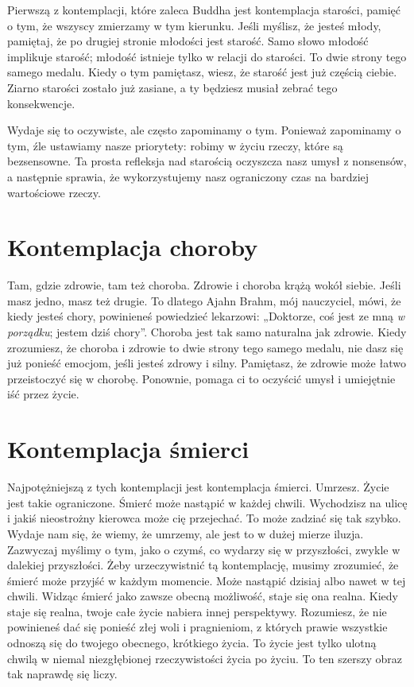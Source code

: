 \documentclass[12pt,openany]{book}
\begin{document}
Pierwszą z kontemplacji, które zaleca Buddha jest kontemplacja starości, pamięć o tym, że wszyscy zmierzamy w tym kierunku. Jeśli myślisz, że jesteś młody, pamiętaj, że po drugiej stronie młodości jest starość. Samo słowo młodość implikuje starość; młodość istnieje tylko w relacji do starości. To dwie strony tego samego medalu. Kiedy o tym pamiętasz, wiesz, że starość jest już częścią ciebie. Ziarno starości zostało już zasiane, a ty będziesz musiał zebrać tego konsekwencje.

Wydaje się to oczywiste, ale często zapominamy o tym. Ponieważ zapominamy o tym, źle ustawiamy nasze priorytety: robimy w życiu rzeczy, które są bezsensowne. Ta prosta refleksja nad starością oczyszcza nasz umysł z nonsensów, a następnie sprawia, że wykorzystujemy nasz ograniczony czas na bardziej war\-to\-ścio\-we rzeczy.

\section*{Kontemplacja choroby}

Tam, gdzie zdrowie, tam też choroba. Zdrowie i choroba krążą wokół siebie. Jeśli masz jedno, masz też drugie. To dlatego Ajahn Brahm, mój nauczyciel, mówi, że kiedy jesteś chory, powinieneś powiedzieć lekarzowi: „Doktorze, coś jest ze mną \textit{w porządku}; jestem dziś chory”. Choroba jest tak samo naturalna jak zdrowie. Kiedy zrozumiesz, że choroba i zdrowie to dwie strony tego samego medalu, nie dasz się już ponieść emocjom, jeśli jesteś zdro\-wy i silny. Pamiętasz, że zdrowie może łatwo przeistoczyć się w chorobę. Ponownie, pomaga ci to oczyścić umysł i umiejętnie iść przez życie.

\section*{Kontemplacja śmierci}

Najpotężniejszą z tych kontemplacji jest kontemplacja śmierci. \linebreak Umrzesz. Życie jest takie ograniczone. Śmierć może nastąpić w każdej chwili. Wychodzisz na ulicę i jakiś nieostrożny kierowca może cię przejechać. To może zadziać się tak szybko.
Wydaje nam się, że wiemy, że umrzemy, ale jest to w dużej mierze iluzja. Zazwyczaj myślimy o tym, jako o czymś, co wydarzy się w przyszłości, zwykle w dalekiej przyszłości. Żeby urzeczywistnić tą kontemplację, musimy zrozumieć, że śmierć może przyjść w każdym momencie. Może nastąpić dzisiaj albo nawet w tej chwili. Widząc śmierć jako zawsze obecną możliwość, staje się ona realna. Kiedy staje się realna, twoje całe życie nabiera innej perspektywy. Rozumiesz, że nie powinieneś dać się ponieść złej woli i pragnieniom, z których prawie wszystkie odnoszą się do twojego obecnego, krótkiego życia. To życie jest tylko ulotną chwilą w niemal niezgłębionej rzeczywistości życia po życiu. To ten szerszy obraz tak naprawdę się liczy.
\end{document}
